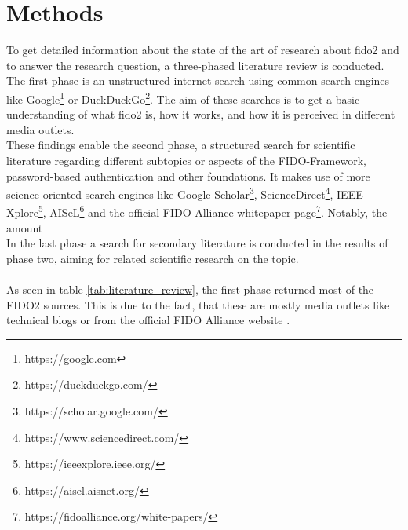 
\section{Methods}
\label{sec:methods}


To get detailed information about the state of the art of research about \ac{fido2} and to answer the research question, a three-phased literature review is conducted.\\
The first phase is an unstructured internet search using common search engines like Google\footnote{https://google.com} or DuckDuckGo\footnote{https://duckduckgo.com/}. The aim of these searches is to get a basic understanding of what \ac{fido2} is, how it works, and how it is perceived in different media outlets.\\
These findings enable the second phase, a structured search for scientific literature regarding different subtopics or aspects of the FIDO-Framework, password-based authentication and other foundations. It makes use of more science-oriented search engines like Google Scholar\footnote{https://scholar.google.com/}, ScienceDirect\footnote{https://www.sciencedirect.com/}, IEEE Xplore\footnote{https://ieeexplore.ieee.org/}, AISeL\footnote{https://aisel.aisnet.org/} and the official FIDO Alliance whitepaper page\footnote{https://fidoalliance.org/white-papers/}. Notably, the amount\\
In the last phase a search for secondary literature is conducted in the results of phase two, aiming for related scientific research on the topic.\\
\\
As seen in table \ref{tab:literature_review}, the first phase returned most of the FIDO2 sources. This is due to the fact, that these are mostly media outlets like technical blogs \citep{hunt2018b,leitner2019, chonng2018, ng2019, mingis2020} or from the official FIDO Alliance website \citep{fido2_overview,fido2_webauthn}.

